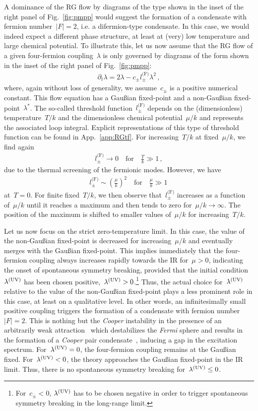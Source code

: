 \documentclass[prd,english,preprintnumbers,amsmath,amssymb,nofootinbib,twocolumn,superscriptaddress]{revtex4-1}
\newcommand{\be}{\begin{eqnarray}}
\newcommand{\ee}{\end{eqnarray}}
\begin{document}
{{A dominance of the RG flow by diagrams of the type 
shown in the inset of the right panel of Fig.~\ref{fig:pmpp} 
would suggest the formation of a condensate with fermion number~$|F|=2$, i.e. a difermion-type condensate.
In this case, we would indeed expect a different phase structure, at least at (very) low temperature and large chemical potential.
To illustrate this, let us now assume that the RG flow of a given four-fermion coupling~$\lambda$ is only governed by diagrams of
the form shown in the inset of the right panel of Fig.~\ref{fig:pmpp}:
%
\be
\partial _t \lambda = 2\lambda - c_{\pm}l^{\text{(F)}}_{\pm}\lambda^2\,,\label{eq:cisfe}
\ee
%
where, again without loss of generality, we assume~$c_{\pm}$ is a positive numerical constant. 
This flow
equation has a Gau\ss ian fixed-point and a non-Gau\ss ian fixed-point~$\lambda^{\ast}$. 
The so-called threshold function~$l^{\text{(F)}}_{\pm}$ depends on the (dimensionless)
temperature~$T/k$ and the dimensionless chemical potential~$\mu/k$ and represents the 
associated loop integral. 
Explicit representations of this type of threshold 
function can be found in App.~\ref{app:RGtf}. 
For increasing~$T/k$ at fixed~$\mu/k$, we find again 
%
\be
l^{\text{(F)}}_{\pm}\to 0\quad\text{for}\quad {\frac{T}{k}} \gg 1\,,
\ee
%
due to the thermal screening of the fermionic
modes. However, we have  
%
\be
l^{\text{(F)}}_{\pm} \sim \left(\frac{\mu}{k}\right)^2\quad\text{for}\quad \frac{\mu}{k} \gg 1\,
\ee
%
at~$T=0$. For finite fixed~$T/k$, we then observe that~$l^{\text{(F)}}_{\pm}$ 
increases as a function of~$\mu/k$ until it reaches a maximum and
then tends to zero for~$\mu/k\to\infty$. The position of the maximum
is shifted to smaller values of~$\mu/k$ for increasing~$T/k$. 

Let us now focus
on the strict zero-temperature limit. In this case, the value of the non-Gau\ss ian fixed-point is decreased for
increasing~$\mu/k$ and eventually merges with the Gau\ss ian fixed-point. This implies immediately that
the four-fermion coupling always increases rapidly towards the IR for~$\mu>0$, indicating the onset of
spontaneous symmetry breaking, provided that the initial condition~$\lambda^{(\rm UV)}$
has been chosen positive,~$\lambda^{(\rm UV)}>0$.\footnote{For~$c_{\pm}<0$, $\lambda^{(\rm UV)}$ has 
to be chosen negative in order to trigger spontaneous symmetry breaking in the long-range limit.}
Thus, the actual choice for~$\lambda^{(\rm UV)}$ relative to the 
value of the non-Gau\ss ian fixed-point plays a less prominent
role in this case, at least on a qualitative level. In other words, an infinitesimally small positive coupling triggers 
the formation of a condensate with fermion number~$|F|=2$. This is nothing but the {\it Cooper} instability
in the presence of an arbitrarily weak attraction~\cite{Cooper:1956zz} which destabilizes the {\it Fermi} sphere and
results in the formation of a {\it Cooper} pair condensate~\cite{Bardeen:1957kj,Bardeen:1957mv}, inducing a gap in the excitation spectrum.
For~$\lambda^{(\rm UV)}=0$, the four-fermion coupling remains at the Gau\ss ian fixed. For~$\lambda^{(\rm UV)}<0$, 
the theory approaches the Gau\ss ian fixed-point in the IR limit. Thus, there is no spontaneous symmetry breaking 
for~$\lambda^{(\rm UV)}\leq 0$.  

}}
\end{document}
